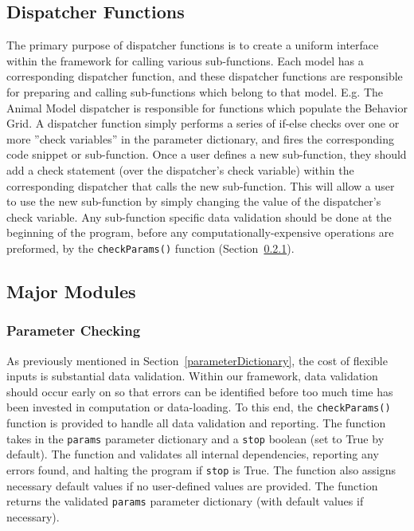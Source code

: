\subsection{Dispatcher Functions}
\label{dispatcherFunctions}
The primary purpose of dispatcher functions is to create a uniform interface within the framework for calling various sub-functions.  Each model has a corresponding dispatcher function, and these dispatcher functions are responsible for preparing and calling sub-functions which belong to that model.  E.g. The Animal Model dispatcher is responsible for functions which populate the Behavior Grid.  A dispatcher function simply performs a series of if-else checks over one or more ''check variables'' in the parameter dictionary, and fires the corresponding code snippet or sub-function.  Once a user defines a new sub-function, they should add a check statement (over the dispatcher's check variable) within the corresponding dispatcher that calls the new sub-function.  This will allow a user to use the new sub-function by simply changing the value of the dispatcher's check variable.  Any sub-function specific data validation should be done at the beginning of the program, before any computationally-expensive operations are preformed, by the \texttt{checkParams()} function (Section~\ref{checkParams}).


\subsection{Major Modules}
\label{majorModules}
\subsubsection{Parameter Checking}
\label{checkParams}
As previously mentioned in Section~\ref{parameterDictionary}, the cost of flexible inputs is substantial data validation.  Within our framework, data validation should occur early on so that errors can be identified before too much time has been invested in computation or data-loading.  To this end, the \texttt{checkParams()} function is provided to handle all data validation and reporting.  The function takes in the \texttt{params} parameter dictionary and a \texttt{stop} boolean (set to True by default).  The function and validates all internal dependencies, reporting any errors found, and halting the program if \texttt{stop} is True.  The function also assigns necessary default values if no user-defined values are provided.  The function returns the validated \texttt{params} parameter dictionary (with default values if necessary).  

